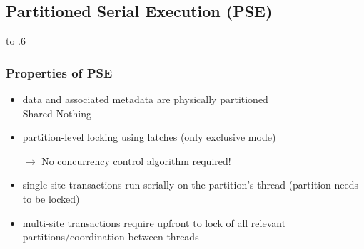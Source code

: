 \subsection[Partitioned Serial Execution]{Partitioned Serial Execution (PSE)}

\begin{frame}
	\vbox to .6
\end{frame}

\begin{frame}
	\frametitle{Properties of PSE}
	
	\begin{itemize}
		\item	data and associated metadata are physically partitioned \\ \bm{$\rightarrow$} Shared-Nothing
		\item	partition-level locking using latches (only exclusive mode)
		\item[$\rightarrow$]	No concurrency control algorithm required!
		\item	single-site transactions run serially on the partition's thread (partition needs to be locked)
		\item	multi-site transactions require upfront to lock of all relevant partitions/coordination between threads
	\end{itemize}
\end{frame}

